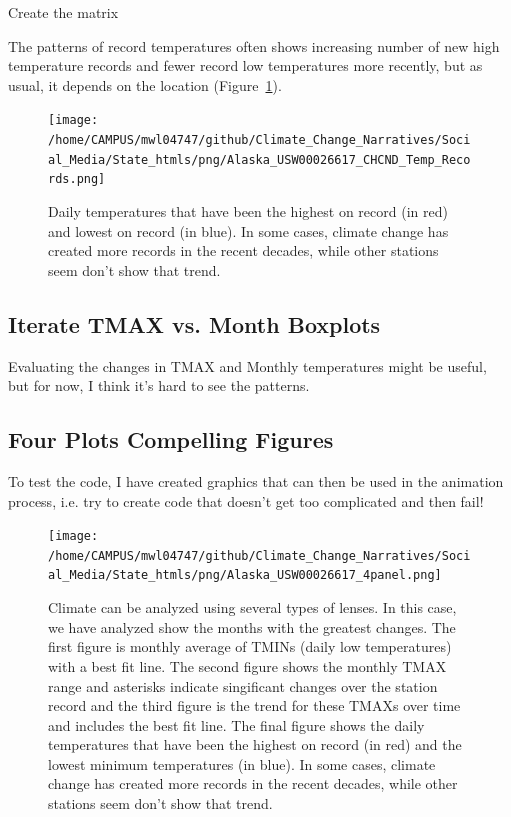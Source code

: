 \documentclass{article}\usepackage[]{graphicx}\usepackage[]{color}
\makeatletter
\newenvironment{kframe}{%
 \def\at@end@of@kframe{}%
 \ifinner\ifhmode%
  \def\at@end@of@kframe{\end{minipage}}%
  \begin{minipage}{\columnwidth}%
 \fi\fi%
 \def\FrameCommand##1{\hskip\@totalleftmargin \hskip-\fboxsep
 \colorbox{shadecolor}{##1}\hskip-\fboxsep
     \hskip-\linewidth \hskip-\@totalleftmargin \hskip\columnwidth}%
 \MakeFramed {\advance\hsize-\width
   \@totalleftmargin\z@ \linewidth\hsize
   \@setminipage}}%
 {\par\unskip\endMakeFramed%
 \at@end@of@kframe}
\newenvironment{knitrout}{}{} %
\makeatother
\begin{document}
Create the matrix
\begin{knitrout}
\color{fgcolor}\begin{kframe}


{\ttfamily\noindent\bfseries\color{errorcolor}{\#\# Error in TMAX.mat.noleap[j, year.seq\$Col[year.seq\$Year == i]] <- CHCND.noleap\$TMAX[CHCND.noleap\$Year == : replacement has length zero}}\end{kframe}
\end{knitrout}




The patterns of record temperatures often shows increasing number of new high temperature records  and fewer record low temperatures more recently, but as usual, it depends on the location (Figure~\ref{fig:Records}).
\begin{figure}
\texttt{[image: /home/CAMPUS/mwl04747/github/Climate\_Change\_Narratives/Social\_Media/State\_htmls/png/Alaska\_USW00026617\_CHCND\_Temp\_Records.png]}
\caption{Daily temperatures that have been the highest on record (in red) and lowest on record (in blue). In some cases, climate change has created more records in the recent decades, while other stations seem don't show that trend.}
\label{fig:Records}
\end{figure}

\subsection{Iterate TMAX vs. Month Boxplots}

Evaluating the changes in TMAX and Monthly temperatures might be useful, but for now, I think it's hard to see the patterns. 




\subsection{Four Plots Compelling Figures}

To test the code, I have created graphics that can then be used in the animation process, i.e. try to create code that doesn't get too complicated and then fail! 



\begin{figure}
\texttt{[image: /home/CAMPUS/mwl04747/github/Climate\_Change\_Narratives/Social\_Media/State\_htmls/png/Alaska\_USW00026617\_4panel.png]}
\caption{Climate can be analyzed using several types of lenses. In this case, we have analyzed show the months with the greatest changes. The first figure is monthly average of TMINs (daily low temperatures) with a best fit line. The second figure shows the monthly TMAX range and asterisks indicate singificant changes over the station record and the third figure is the trend for these TMAXs over time and includes the best fit line. The final figure shows the daily temperatures that have been the highest on record (in red) and the lowest minimum temperatures (in blue). In some cases, climate change has created more records in the recent decades, while other stations seem don't show that trend.}
\label{fig:4panel}
\end{figure}
\end{document}
